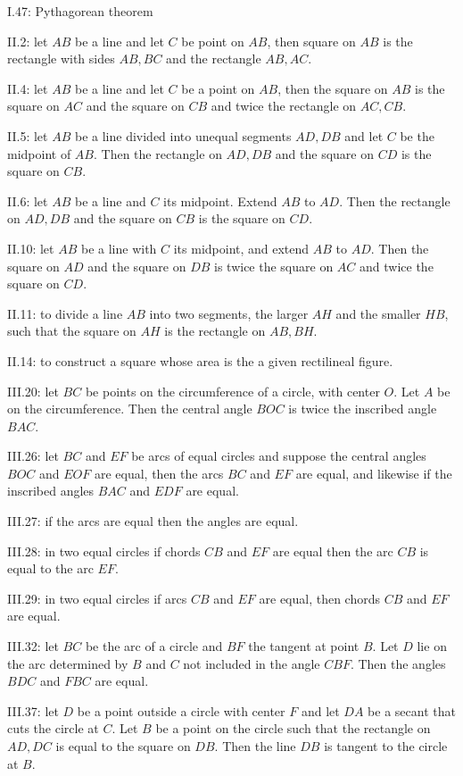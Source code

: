 \documentclass{article}
\theoremstyle{definition}
\begin{document}
I.47: Pythagorean theorem

II.2: let $AB$ be a line and let $C$ be point on $AB$, then square on $AB$ is the rectangle with sides $AB,BC$ and the rectangle
$AB,AC$.

II.4: let $AB$ be a line and let $C$ be a point on $AB$, then the square on $AB$ is the square on $AC$ and the square on $CB$
and twice the rectangle on $AC,CB$. 

II.5: let $AB$ be a line divided into unequal segments $AD,DB$ and let $C$ be the midpoint of $AB$. Then the rectangle on $AD,DB$ and the square on $CD$
is the square on $CB$.

II.6: let $AB$ be a line and $C$ its midpoint. Extend $AB$ to $AD$. Then the rectangle on $AD,DB$ and the square on $CB$ is the square on $CD$.

II.10: let $AB$ be a line with $C$ its midpoint, and extend $AB$ to $AD$. Then the square on $AD$ and the square on $DB$ is twice the square on $AC$ and twice the square
on $CD$. 

II.11: to divide a line $AB$ into two segments, the larger $AH$ and the smaller $HB$, such that the square on $AH$ is the rectangle
on $AB,BH$. 

II.14: to construct a square whose area is the a given rectilineal figure.

III.20: let $BC$ be points on the circumference of a circle, with center $O$. Let $A$ be on the circumference. Then
the central angle $BOC$ is twice the inscribed angle $BAC$. 

III.26: let $BC$ and $EF$ be arcs of equal circles and suppose the central angles $BOC$ and $EOF$ are equal, then
the arcs $BC$ and $EF$ are equal, and likewise if the inscribed angles $BAC$ and $EDF$ are equal.

III.27: if the arcs are equal then the angles are equal.

III.28: in two equal circles if chords $CB$ and $EF$ are equal then the arc $CB$ is equal to the arc $EF$.

III.29: in two equal circles if arcs $CB$ and $EF$ are equal, then chords $CB$  and $EF$ are equal.

III.32: let $BC$ be the arc of a circle and $BF$ the tangent at point $B$. Let $D$ lie on the arc determined by $B$ and $C$  not included
in the angle $CBF$. Then the angles $BDC$ and $FBC$ are equal.

III.37: let $D$ be a point outside a circle with center $F$ and let $DA$ be a secant that cuts the circle at $C$. Let $B$ be a point on the circle
such that the rectangle on $AD,DC$ is equal to the square on $DB$.
Then the line $DB$ is tangent to the circle at $B$.
\end{document}
